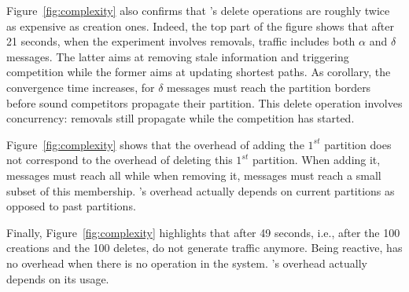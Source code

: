 \begin{asparadesc}
\noindent Figure~\ref{fig:complexity} also confirms that \NAME's
delete operations are roughly twice as expensive as creation
ones. Indeed, the top part of the figure shows that after 21 seconds,
when the experiment involves removals, traffic includes both
$\alpha$ and $\delta$ messages. The latter aims at removing stale
information and triggering competition while the former aims at
updating shortest paths. As corollary, the convergence time increases,
for $\delta$ messages must reach the partition borders before sound
competitors propagate their partition. %
This
delete operation involves concurrency: removals still propagate while
the competition has started.

\noindent Figure~\ref{fig:complexity} shows that the overhead of
adding the $1^{st}$ partition does not correspond to the overhead of
deleting this $1^{st}$ partition. When adding it, messages must reach
all \processes while when removing it, messages must reach a small
subset of this membership.  \NAME's overhead actually depends on
current partitions as opposed to past partitions.

\noindent Finally, Figure~\ref{fig:complexity} highlights that after
49 seconds, i.e., after the 100 creations and the 100 deletes, \processes
do not generate traffic anymore. Being reactive, \NAME has no overhead
 when there is no operation in the system. \NAME's overhead actually
depends on its usage.

\end{asparadesc}



